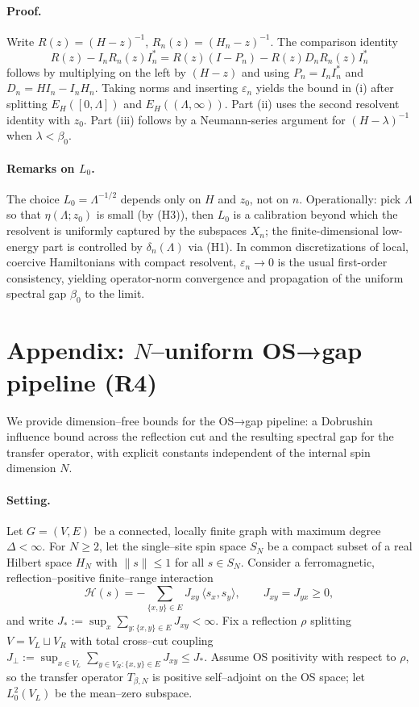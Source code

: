 \documentclass[11pt]{amsart}
\theoremstyle{plain}
\theoremstyle{definition}
\theoremstyle{remark}
\begin{document}
\paragraph{Proof.}
Write $R(z)=(H-z)^{-1}$, $R_n(z)=(H_n-z)^{-1}$. The comparison identity
\[
  R(z)-I_n R_n(z) I_n^*= R(z)(I-P_n) - R(z) D_n R_n(z) I_n^*
\]
follows by multiplying on the left by $(H-z)$ and using $P_n=I_n I_n^*$ and $D_n=H I_n-I_n H_n$. Taking norms and inserting $\varepsilon_n$ yields the bound in (i) after splitting $E_H([0,\Lambda])$ and $E_H((\Lambda,\infty))$. Part (ii) uses the second resolvent identity with $z_0$. Part (iii) follows by a Neumann-series argument for $(H-\lambda)^{-1}$ when $\lambda<\beta_0$.

\paragraph{Remarks on $L_0$.}
The choice $L_0=\Lambda^{-1/2}$ depends only on $H$ and $z_0$, not on $n$. Operationally: pick $\Lambda$ so that $\eta(\Lambda;z_0)$ is small (by (H3)), then $L_0$ is a calibration beyond which the resolvent is uniformly captured by the subspaces $X_n$; the finite-dimensional low-energy part is controlled by $\delta_n(\Lambda)$ via (H1). In common discretizations of local, coercive Hamiltonians with compact resolvent, $\varepsilon_n\to 0$ is the usual first-order consistency, yielding operator-norm convergence and propagation of the uniform spectral gap $\beta_0$ to the limit.

\section{Appendix: $N$–uniform OS→gap pipeline (R4)}

We provide dimension–free bounds for the OS→gap pipeline: a Dobrushin influence bound across the reflection cut and the resulting spectral gap for the transfer operator, with explicit constants independent of the internal spin dimension $N$.

\paragraph{Setting.}
Let $G=(V,E)$ be a connected, locally finite graph with maximum degree $\Delta<\infty$. For $N\ge 2$, let the single–site spin space $S_N$ be a compact subset of a real Hilbert space $H_N$ with $\|s\|\le 1$ for all $s\in S_N$. Consider a ferromagnetic, reflection–positive finite–range interaction
\[
  \mathcal{H}(s)= -\sum_{\{x,y\}\in E} J_{xy}\,\langle s_x,s_y\rangle,\qquad J_{xy}=J_{yx}\ge 0,
\]
and write $J_{\!*}:=\sup_x \sum_{y:\{x,y\}\in E} J_{xy}<\infty$. Fix a reflection $\rho$ splitting $V=V_L\sqcup V_R$ with total cross--cut coupling $J_{\perp}:=\sup_{x\in V_L}\sum_{y\in V_R:\{x,y\}\in E} J_{xy}\le J_{\!*}$. Assume OS positivity with respect to $\rho$, so the transfer operator $T_{\beta,N}$ is positive self--adjoint on the OS space; let $L^2_0(V_L)$ be the mean--zero subspace.
\end{document}
